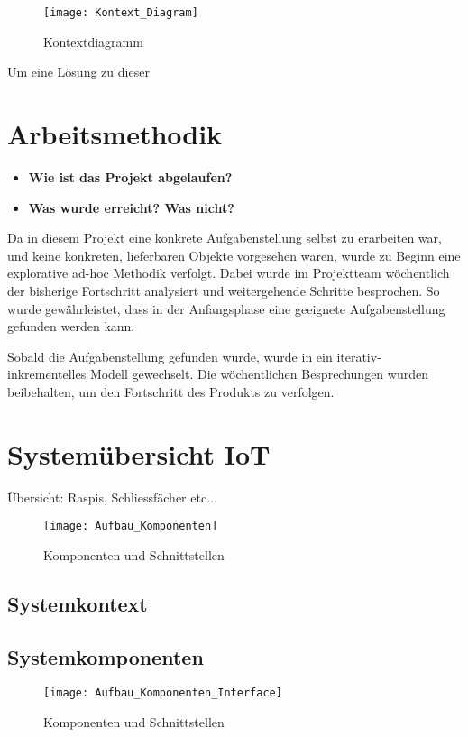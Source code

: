     
\begin{figure}
\centering
\texttt{[image: Kontext\_Diagram]}
\caption{Kontextdiagramm}
\label{fig:Aufbau Komponenten und Schnittstellen}
\end{figure}
Um eine Lösung zu dieser 

\section{Arbeitsmethodik}
\begin{itemize}
    \item \textbf{Wie ist das Projekt abgelaufen?}
    \item \textbf{Was wurde erreicht? Was nicht?}
\end{itemize}
Da in diesem Projekt eine konkrete Aufgabenstellung selbst zu erarbeiten war, und keine konkreten, lieferbaren Objekte vorgesehen waren, wurde zu Beginn eine explorative ad-hoc Methodik verfolgt. Dabei wurde im Projektteam wöchentlich der bisherige Fortschritt analysiert und weitergehende Schritte besprochen. So wurde gewährleistet, dass in der Anfangsphase eine geeignete Aufgabenstellung gefunden werden kann.
\par
Sobald die Aufgabenstellung gefunden wurde, wurde in ein iterativ- inkrementelles Modell gewechselt. Die wöchentlichen Besprechungen wurden beibehalten, um den Fortschritt des Produkts zu verfolgen.

\section{Systemübersicht IoT}
\label{sec:Setup_IoT}
Übersicht: Raspis, Schliessfächer etc...
\begin{figure}
\centering
\texttt{[image: Aufbau\_Komponenten]}
\caption{Komponenten und Schnittstellen}
\label{fig:Aufbau Komponenten}
\end{figure}
\subsection{Systemkontext}

\subsection{Systemkomponenten}

\begin{figure}
\centering
\texttt{[image: Aufbau\_Komponenten\_Interface]}
\caption{Komponenten und Schnittstellen}
\label{fig:Aufbau Komponenten und Schnittstellen}
\end{figure}




